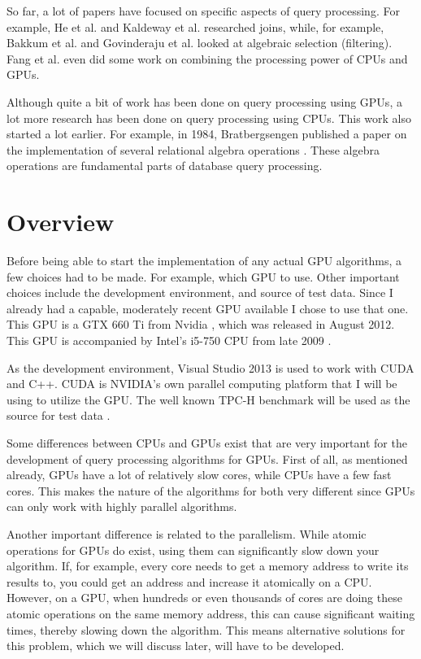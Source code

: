 \documentclass[a4paper,titlepage]{article}
\begin{document}
So far, a lot of papers have focused on specific aspects of query processing. For example, He et al. \cite{he2008} and Kaldeway et al. \cite{kaldeway2010} researched joins, while, for example, Bakkum et al. \cite{bakkum2010} and Govinderaju et al. \cite{govindaraju2004} looked at algebraic selection (filtering).  Fang et al. \cite{fang2007} even did some work on combining the processing power of CPUs and GPUs.

Although quite a bit of work has been done on query processing using GPUs, a lot more research has been done on query processing using CPUs. This work also started a lot earlier. For example, in 1984, Bratbergsengen published a paper on the implementation of several relational algebra operations \cite{bratbergsengen1984}. These algebra operations are fundamental parts of database query processing.

\section{Overview}
\label{sec:overview}
Before being able to start the implementation of any actual GPU algorithms, a few choices had to be made. For example, which GPU to use. Other important choices include the development environment, and source of test data. Since I already had a capable, moderately recent GPU available I chose to use that one. This GPU is a GTX 660 Ti from Nvidia \cite{gtx660ti}, which was released in August 2012. This GPU is accompanied by Intel's i5-750 CPU from late 2009 \cite{i5-750}.

As the development environment, Visual Studio 2013 is used to work with CUDA \cite{CUDA} and C++. CUDA is NVIDIA's own parallel computing platform that I will be using to utilize the GPU. The well known TPC-H benchmark will be used as the source for test data \cite{tpc-h}.

Some differences between CPUs and GPUs exist that are very important for the development of query processing algorithms for GPUs. First of all, as mentioned already, GPUs have a lot of relatively slow cores, while CPUs have a few fast cores. This makes the nature of the algorithms for both very different since GPUs can only work with highly parallel algorithms.

Another important difference is related to the parallelism. While atomic operations for GPUs do exist, using them can significantly slow down your algorithm. If, for example, every core needs to get a memory address to write its results to, you could get an address and increase it atomically on a CPU. However, on a GPU, when hundreds or even thousands of cores are doing these atomic operations on the same memory address, this can cause significant waiting times, thereby slowing down the algorithm. This means alternative solutions for this problem, which we will discuss later, will have to be developed.
\end{document}
